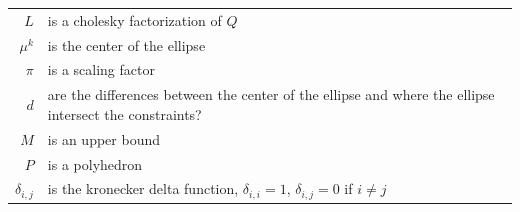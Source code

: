 \documentclass{article}
\theoremstyle{case}
\begin{document}
\begin{table}
\begin{center}
\begin{tabular}{r p{10cm} }
$L$ & is a cholesky factorization of $Q$ \\
$\mu^k$ & is the center of the ellipse \\
$\pi$ & is a scaling factor \\
$d$ & are the differences between the center of the ellipse and where the ellipse intersect the constraints? \\
$M$ & is an upper bound \\
$P$ & is a polyhedron \\
$\delta_{i,j}$ & is the kronecker delta function, $\delta_{i,i} = 1$, $\delta_{i,j} = 0$ if $i\ne j$
\end{tabular}
\end{center}
\label{tab:TableOfNotation}
\end{table}

\newpage



\end{document}
